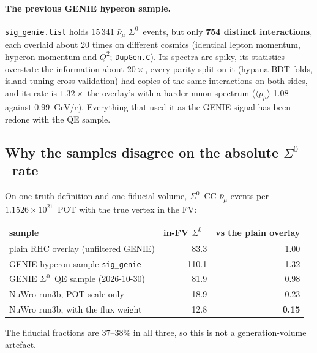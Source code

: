 \documentclass[11pt,a4paper]{article}
\newcommand{\Szero}{\ensuremath{\Sigma^{0}}}
\newcommand{\numubar}{\ensuremath{\bar{\nu}_\mu}}
\begin{document}
\paragraph{The previous GENIE hyperon sample.} \texttt{sig\_genie.list} holds 15\,341
$\numubar$ \Szero\ events, but only \textbf{754 distinct interactions}, each overlaid
about 20 times on different cosmics (identical lepton momentum, hyperon momentum and
$Q^2$; \texttt{DupGen.C}). Its spectra are spiky, its statistics overstate the
information about $20\times$, every parity split on it (hypana BDT folds, island
tuning cross-validation) had copies of the same interactions on both sides, and its
rate is $1.32\times$ the overlay's with a harder muon spectrum ($\langle p_\mu\rangle$
1.08 against 0.99~GeV/$c$). Everything that used it as the GENIE signal has been redone
with the QE sample.

\subsection{Why the samples disagree on the absolute \Szero\ rate}
\label{sec:rate}

On one truth definition and one fiducial volume, \Szero\ CC $\numubar$ events per
$1.1526\times10^{21}$~POT with the true vertex in the FV:

\begin{center}
\begin{tabular}{lrr}
\toprule
sample & in-FV \Szero\ & vs the plain overlay \\
\midrule
plain RHC overlay (unfiltered GENIE)      &  83.3 & 1.00 \\
GENIE hyperon sample \texttt{sig\_genie}  & 110.1 & 1.32 \\
GENIE \Szero\ QE sample (2026-10-30)      &  81.9 & 0.98 \\
NuWro run3b, POT scale only               &  18.9 & 0.23 \\
NuWro run3b, with the flux weight         &  12.8 & \textbf{0.15} \\
\bottomrule
\end{tabular}
\end{center}

\noindent The fiducial fractions are $37$--$38\%$ in all three, so this is not a
generation-volume artefact.
\end{document}
